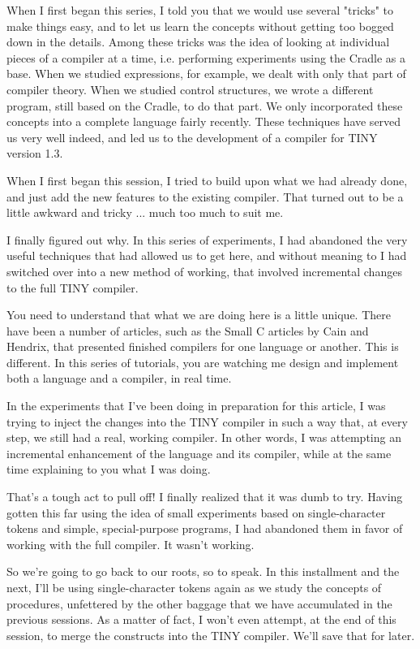 \documentclass[float=false, crop=false]{standalone}
\begin{document}
When I first began this series, I told you that we would use several "tricks" to
make things easy, and to let us learn the concepts without getting too bogged
down in the details. Among these tricks was the idea of looking at individual
pieces of a compiler at a time, i.e. performing experiments using the Cradle as
a base. When we studied expressions, for example, we dealt with only that part
of compiler theory. When we studied control structures, we wrote a different
program, still based on the Cradle, to do that part. We only incorporated these
concepts into a complete language fairly recently. These techniques have served
us very well indeed, and led us to the development of a compiler for TINY
version 1.3.

When I first began this session, I tried to build upon what we had already done,
and just add the new features to the existing compiler. That turned out to be a
little awkward and tricky ... much too much to suit me.

I finally figured out why. In this series of experiments, I had abandoned the
very useful techniques that had allowed us to get here, and without meaning to I
had switched over into a new method of working, that involved incremental
changes to the full TINY compiler.

You need to understand that what we are doing here is a little unique. There
have been a number of articles, such as the Small C articles by Cain and
Hendrix, that presented finished compilers for one language or another. This is
different. In this series of tutorials, you are watching me design and implement
both a language and a compiler, in real time.

In the experiments that I've been doing in preparation for this article, I was
trying to inject the changes into the TINY compiler in such a way that, at every
step, we still had a real, working compiler. In other words, I was attempting an
incremental enhancement of the language and its compiler, while at the same time
explaining to you what I was doing.

That's a tough act to pull off! I finally realized that it was dumb to try.
Having gotten this far using the idea of small experiments based on
single-character tokens and simple, special-purpose programs, I had abandoned
them in favor of working with the full compiler. It wasn't working.

So we're going to go back to our roots, so to speak. In this installment and the
next, I'll be using single-character tokens again as we study the concepts of
procedures, unfettered by the other baggage that we have accumulated in the
previous sessions. As a matter of fact, I won't even attempt, at the end of this
session, to merge the constructs into the TINY compiler. We'll save that for
later.
\end{document}
